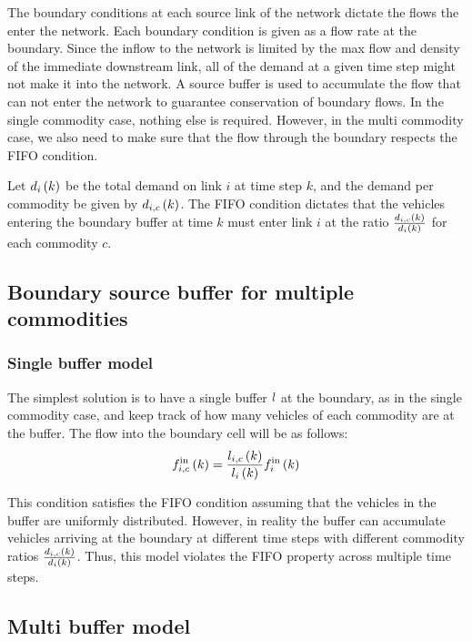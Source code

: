 

The boundary conditions at each source link of the network dictate the flows the enter the network. Each boundary condition is given as a flow rate at the boundary. Since the inflow to the network is limited by the max flow and density of the immediate downstream link, all of the demand at a given time step might not make it into the network. A source buffer is used to accumulate the flow that can not enter the network to guarantee conservation of boundary flows. In the single commodity case, nothing else is required. However, in the multi commodity case, we also need to make sure that the flow through the boundary respects the FIFO condition. 

Let $\boundarydemand{i}{k}$ be the total demand on link $i$ at time step $k$, and the demand per commodity be given by $\boundarydemandmc{i}{k}{c}$. The FIFO condition dictates that the vehicles entering the boundary buffer at time $k$ must enter link $i$ at the ratio $\frac{\boundarydemandmc{i}{k}{c}}{\boundarydemand{i}{k}}$ for each commodity $c$.

\subsection{Boundary source buffer for multiple commodities}

\subsubsection{Single buffer model}

The simplest solution is to have a single buffer $\boundaryqueuesymbol$ at the boundary, as in the single commodity case, and keep track of how many vehicles of each commodity are at the buffer. The flow into the boundary cell will be as follows:
\[
	\flowinmc{i}{k}{c} = \frac{\boundaryqueuemc{i}{k}{c}}{\boundaryqueue{i}{k}} \flowin{i}{k}
\]

This condition satisfies the FIFO condition assuming that the vehicles in the buffer are uniformly distributed. However, in reality the buffer can accumulate vehicles arriving at the boundary at different time steps with different commodity ratios $\frac{\boundarydemandmc{i}{k}{c}}{\boundarydemand{i}{k}}$. Thus, this model violates the FIFO property across multiple time steps.

\subsection{Multi buffer model}

